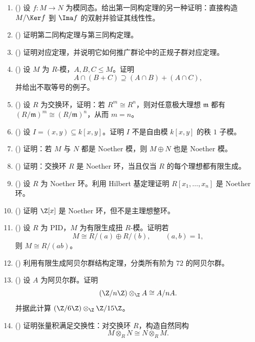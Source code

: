 \begin{enumerate}[label=\textbf{10.\arabic*.}, leftmargin=3.2em, start=26]
  \item (\medium) 设 $f\colon M\to N$ 为模同态。给出第一同构定理的另一种证明：直接构造 $M/\Ker f$ 到 $\Ima f$ 的双射并验证其线性性。

  \item (\medium) 证明第二同构定理与第三同构定理。

  \item (\medium) 证明对应定理，并说明它如何推广群论中的正规子群对应定理。

  \item (\medium) 设 $M$ 为 $R$-模，$A,B,C\le M$。证明
  \[
  A\cap (B+C)\supseteq (A\cap B)+(A\cap C),
  \]
  并给出不取等号的例子。

  \item (\medium) 设 $R$ 为交换环，证明：若 $R^m\cong R^n$，则对任意极大理想 $\mathfrak m$ 都有 $(R/\mathfrak m)^m\cong (R/\mathfrak m)^n$，从而 $m=n$。

  \item (\medium) 设 $I=(x,y)\subseteq k[x,y]$。证明 $I$ 不是自由模 $k[x,y]$ 的秩 $1$ 子模。

  \item (\medium) 证明：若 $M$ 与 $N$ 都是 Noether 模，则 $M\oplus N$ 也是 Noether 模。

  \item (\medium) 证明：交换环 $R$ 是 Noether 环，当且仅当 $R$ 的每个理想都有限生成。

  \item (\medium) 设 $R$ 为 Noether 环。利用 Hilbert 基定理证明 $R[x_1,\dots,x_n]$ 是 Noether 环。

  \item (\medium) 证明 $\Z[x]$ 是 Noether 环，但不是主理想整环。

  \item (\medium) 设 $R$ 为 PID，$M$ 为有限生成扭 $R$-模。证明若
  \[
  M\cong R/(a)\oplus R/(b),\qquad (a,b)=1,
  \]
  则 $M\cong R/(ab)$。

  \item (\medium) 利用有限生成阿贝尔群结构定理，分类所有阶为 $72$ 的阿贝尔群。

  \item (\medium) 设 $A$ 为阿贝尔群。证明
  \[
  (\Z/n\Z)\otimes_\Z A\cong A/nA.
  \]
  并据此计算 $(\Z/6\Z)\otimes_\Z \Z/15\Z$。

  \item (\medium) 证明张量积满足交换性：对交换环 $R$，构造自然同构
  \[
  M\otimes_R N\cong N\otimes_R M.
  \]


\end{enumerate}
